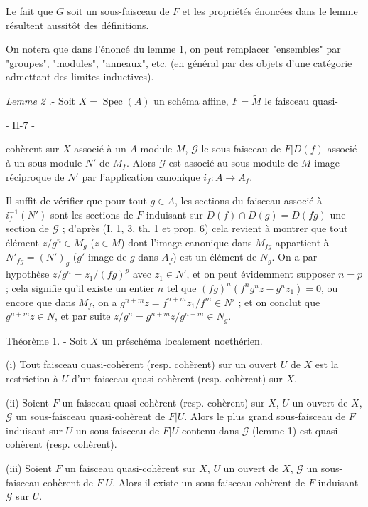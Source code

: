 Le fait que $\overline{G}$ soit un sous-faisceau de $F$ et les propriétés énoncées dans le lemme résultent aussitôt des définitions.

On notera que dans l'énoncé du lemme 1, on peut remplacer "ensembles" par "groupes", "modules", "anneaux", etc. (en général par des objets d'une catégorie admettant des limites inductives).

\emph{Lemme 2} .- Soit $X = \operatorname{Spec}(A)$ un schéma affine, $F = \tilde{M}$ le faisceau quasi-

\newpage


- II-7 -

cohèrent sur $X$ associé à un $A$-module $M$, $\mathcal{G}$ le sous-faisceau de $F|D(f)$ associé à un sous-module $N'$ de $M_f$. Alors $\mathcal{G}$ est associé au sous-module de $M$ image réciproque de $N'$ par l'application canonique $i_f: A \to A_f$.

Il suffit de vérifier que pour tout $g \in A$, les sections du faisceau associé à $i_f^{-1}(N')$ sont les sections de $F$ induisant sur $D(f) \cap D(g) = D(fg)$ une section de $\mathcal{G}$ ; d'après (I, 1, 3, th. 1 et prop. 6) cela revient à montrer que tout élément $z/g^n \in M_g$ ($z \in M$) dont l'image canonique dans $M_{fg}$ appartient à $N'_{fg} = (N')_g$ ($g'$ image de $g$ dans $A_f$) est un élément de $N_g$. On a par hypothèse $z/g^n = z_1/(fg)^p$ avec $z_1 \in N'$, et on peut évidemment supposer $n=p$ ; cela signifie qu'il existe un entier $n$ tel que $(fg)^n (f^n g^n z - g^n z_1) = 0$, ou encore que dans $M_f$, on a $g^{n+m} z = f^{n+m} z_1/f^m \in N'$ ; et on conclut que $g^{n+m} z \in N$, et par suite $z/g^n = g^{n+m} z / g^{n+m} \in N_g$.

Théorème 1. - Soit $X$ un préschéma localement noethérien.

(i) Tout faisceau quasi-cohèrent (resp. cohèrent) sur un ouvert $U$ de $X$ est la restriction à $U$ d'un faisceau quasi-cohèrent (resp. cohèrent) sur $X$.

(ii) Soient $F$ un faisceau quasi-cohèrent (resp. cohèrent) sur $X$, $U$ un ouvert de $X$, $\mathcal{G}$ un sous-faisceau quasi-cohèrent de $F|U$. Alors le plus grand sous-faisceau de $F$ induisant sur $U$ un sous-faisceau de $F|U$ contenu dans $\mathcal{G}$ (lemme 1) est quasi-cohèrent (resp. cohèrent).

(iii) Soient $F$ un faisceau quasi-cohèrent sur $X$, $U$ un ouvert de $X$, $\mathcal{G}$ un sous-faisceau cohèrent de $F|U$. Alors il existe un sous-faisceau cohèrent de $F$ induisant $\mathcal{G}$ sur $U$.

